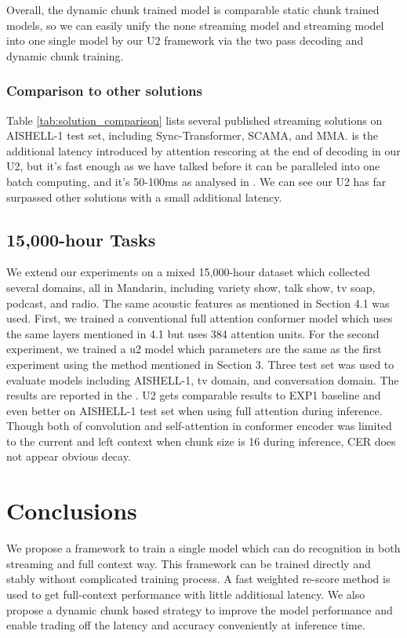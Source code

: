 \documentclass[a4paper]{article}
\begin{document}
Overall, the dynamic chunk trained model is comparable static chunk trained models, so we can easily unify the none streaming model and streaming model into one single model by our U2 framework via the two pass decoding and dynamic chunk training.

\subsubsection{Comparison to other solutions}
  
Table \ref{tab:solution_comparison} lists several published streaming solutions on AISHELL-1 test set, including Sync-Transformer\cite{tian2020synchronous}, SCAMA\cite{zhang2020streaming},  and MMA\cite{inaguma2020enhancing}.  is the additional latency introduced by attention rescoring at the end of decoding in our U2, but it's fast enough as we have talked before it can be paralleled into one batch computing, and it's 50-100ms as analysed in \cite{sainath2019two,tripathi2020transformer}. We can see our U2 has far surpassed other solutions with a small additional latency.\\

\subsection{15,000-hour Tasks}

We extend our experiments on a mixed 15,000-hour dataset which collected several domains, all in Mandarin, including variety show, talk show, tv soap, podcast, and radio.
The same acoustic features as mentioned in Section 4.1 was used.
First, we trained a conventional full attention conformer model which uses the same layers mentioned in 4.1 but uses 384 attention units.
For the second experiment, we trained a u2 model which parameters are the same as the first experiment using the method mentioned in Section 3. 
Three test set was used to evaluate models including AISHELL-1, tv domain, and conversation domain. The results are reported in the \label{tab:15000 hour}.
U2 gets comparable results to EXP1 baseline and even better on AISHELL-1 test set when using full attention during inference. 
Though both of convolution and self-attention in conformer encoder was limited to the current and left context when chunk size is 16 during inference, CER does not appear obvious decay.

\section{Conclusions}
 We propose a framework to train a single model which can do recognition in both streaming and full context way. This framework can be trained directly and stably without complicated training process. A fast weighted re-score method is used to get full-context performance with little additional latency. We also propose a dynamic chunk based strategy to improve the model performance and enable trading off the latency and accuracy conveniently at inference time. 

\newpage



\end{document}
